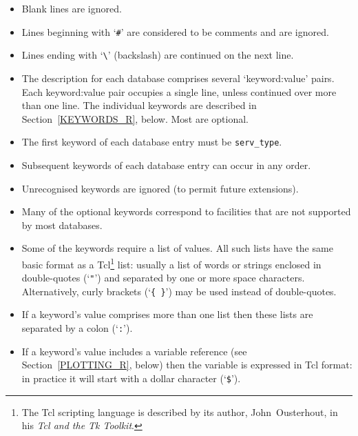 \documentclass[twoside,11pt,nolof,chapters]{starlink}
\begin{document}
\begin{itemize}

  \item Blank lines are ignored.

  \item Lines beginning with `\texttt{\#}' are considered to be comments
   and are ignored.

  \item Lines ending with `\texttt{\textbackslash}' (backslash) are continued
   on the next line.

  \item The description for each database comprises several `keyword:value'
   pairs.  Each keyword:value pair occupies a single line, unless continued
   over more than one line.  The individual keywords are described in
   Section~\ref{KEYWORDS_R}, below.  Most are optional.

  \item The first keyword of each database entry must be \texttt{serv\_type}.

  \item Subsequent keywords of each database entry can occur in any
   order.

  \item Unrecognised keywords are ignored (to permit future extensions).

  \item Many of the optional keywords correspond to facilities that are not
   supported by most databases.

  \item Some of the keywords require a list of values.  All such lists
   have the same basic format as a Tcl\footnote{The Tcl scripting language
   is described by its author, John~Ousterhout, in his \textit{Tcl and the Tk
   Toolkit}\/\cite{OUSTERHOUT94}.} list: usually a list of words
   or strings enclosed in double-quotes (`\texttt{"}') and separated by one
   or more space characters.  Alternatively, curly brackets (`\texttt{\{ \}}')
   may be used instead of double-quotes.

  \item If a keyword's value comprises more than one list then these
   lists are separated by a colon (`\texttt{:}').

  \item If a keyword's value includes a variable reference (see
   Section~\ref{PLOTTING_R}, below) then the variable is expressed in
   Tcl format: in practice it will start with a dollar character (`\texttt{\$}').

\end{itemize}
\end{document}
